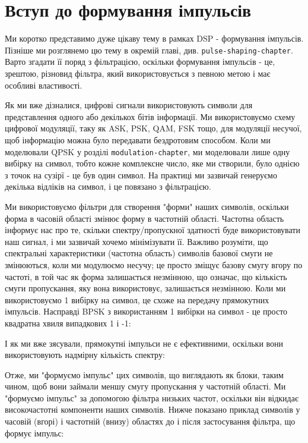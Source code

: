 \section{Вступ до формування
імпульсів}\label{ux432ux441ux442ux443ux43f-ux434ux43e-ux444ux43eux440ux43cux443ux432ux430ux43dux43dux44f-ux456ux43cux43fux443ux43bux44cux441ux456ux432}

Ми коротко представимо дуже цікаву тему в рамках DSP - формування
імпульсів. Пізніше ми розглянемо цю тему в окремій главі, див.
\texttt{pulse-shaping-chapter}. Варто згадати її поряд з фільтрацією,
оскільки формування імпульсів - це, зрештою, різновид фільтра, який
використовується з певною метою і має особливі властивості.

Як ми вже дізналися, цифрові сигнали використовують символи для
представлення одного або декількох бітів інформації. Ми використовуємо
схему цифрової модуляції, таку як ASK, PSK, QAM, FSK тощо, для модуляції
несучої, щоб інформацію можна було передавати бездротовим способом. Коли
ми моделювали QPSK у розділі \texttt{modulation-chapter}, ми моделювали
лише одну вибірку на символ, тобто кожне комплексне число, яке ми
створили, було однією з точок на сузір\textquotesingle ї - це був один
символ. На практиці ми зазвичай генеруємо декілька відліків на символ, і
це пов\textquotesingle язано з фільтрацією.

Ми використовуємо фільтри для створення "форми" наших символів, оскільки
форма в часовій області змінює форму в частотній області. Частотна
область інформує нас про те, скільки спектру/пропускної здатності буде
використовувати наш сигнал, і ми зазвичай хочемо мінімізувати її.
Важливо розуміти, що спектральні характеристики (частотна область)
символів базової смуги не змінюються, коли ми модулюємо несучу; це
просто зміщує базову смугу вгору по частоті, в той час як форма
залишається незмінною, що означає, що кількість смуги пропускання, яку
вона використовує, залишається незмінною. Коли ми використовуємо 1
вибірку на символ, це схоже на передачу прямокутних імпульсів. Насправді
BPSK з використанням 1 вибірки на символ - це просто квадратна хвиля
випадкових 1 і -1:

\href{../_images/bpsk.svg}{}

І як ми вже з\textquotesingle ясували, прямокутні імпульси не є
ефективними, оскільки вони використовують надмірну кількість спектру:



Отже, ми "формуємо імпульс" цих символів, що виглядають як блоки, таким
чином, щоб вони займали меншу смугу пропускання у частотній області. Ми
"формуємо імпульс" за допомогою фільтра низьких частот, оскільки він
відкидає високочастотні компоненти наших символів. Нижче показано
приклад символів у часовій (вгорі) і частотній (внизу) областях до і
після застосування фільтра, що формує імпульс:

